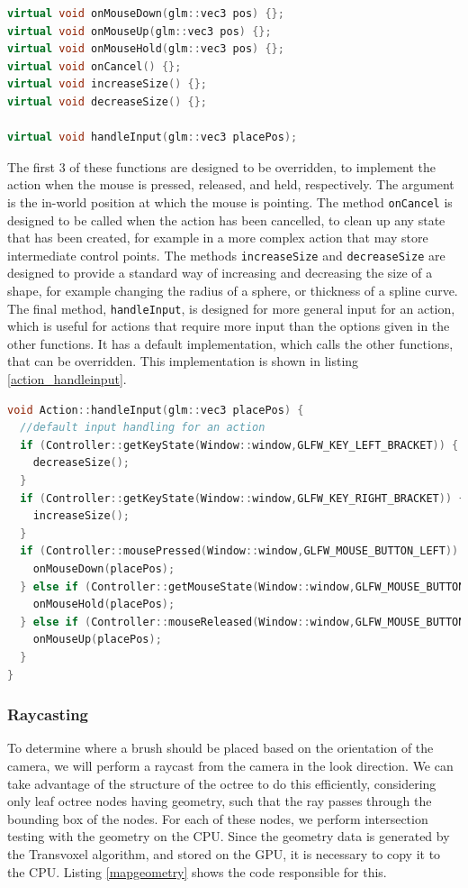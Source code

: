 \documentclass{article}
\begin{document}
\begin{lstlisting}[language=C++,label={action_methods},caption={The methods of the \texttt{Action} class responsible for handling user interaction}]
virtual void onMouseDown(glm::vec3 pos) {};
virtual void onMouseUp(glm::vec3 pos) {};
virtual void onMouseHold(glm::vec3 pos) {};
virtual void onCancel() {};
virtual void increaseSize() {};
virtual void decreaseSize() {};

virtual void handleInput(glm::vec3 placePos);
\end{lstlisting}
The first 3 of these functions are designed to be overridden, to implement the action when the mouse is pressed, released, and held, respectively. The argument is the in-world position at which the mouse is pointing. The method \texttt{onCancel} is designed to be called when the action has been cancelled, to clean up any state that has been created, for example in a more complex action that may store intermediate control points. The methods \texttt{increaseSize} and \texttt{decreaseSize} are designed to provide a standard way of increasing and decreasing the size of a shape, for example changing the radius of a sphere, or thickness of a spline curve. The final method, \texttt{handleInput}, is designed for more general input for an action, which is useful for actions that require more input than the options given in the other functions. It has a default implementation, which calls the other functions, that can be overridden. This implementation is shown in listing \ref{action_handleinput}.
\begin{lstlisting}[language=C++,label={action_handleinput},caption={Default implementation of \texttt{handleInput}}]
void Action::handleInput(glm::vec3 placePos) {
  //default input handling for an action
  if (Controller::getKeyState(Window::window,GLFW_KEY_LEFT_BRACKET)) {
    decreaseSize();
  }
  if (Controller::getKeyState(Window::window,GLFW_KEY_RIGHT_BRACKET)) {
    increaseSize();
  }
  if (Controller::mousePressed(Window::window,GLFW_MOUSE_BUTTON_LEFT)) {
    onMouseDown(placePos);
  } else if (Controller::getMouseState(Window::window,GLFW_MOUSE_BUTTON_LEFT)) {
    onMouseHold(placePos);
  } else if (Controller::mouseReleased(Window::window,GLFW_MOUSE_BUTTON_LEFT)) {
    onMouseUp(placePos);
  }
}
\end{lstlisting}
\subsubsection{Raycasting}
\label{section:raycasting}
To determine where a brush should be placed based on the orientation of the camera, we will perform a raycast from the camera in the look direction. We can take advantage of the structure of the octree to do this efficiently, considering only leaf octree nodes having geometry, such that the ray passes through the bounding box of the nodes. For each of these nodes, we perform intersection testing with the geometry on the CPU. Since the geometry data is generated by the Transvoxel algorithm, and stored on the GPU, it is necessary to copy it to the CPU. Listing \ref{mapgeometry} shows the code responsible for this.
\end{document}
